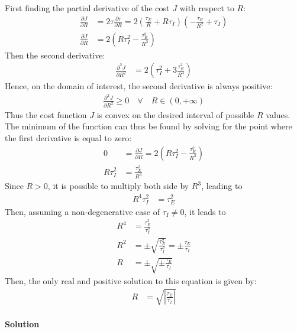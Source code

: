 First finding the partial derivative of the cost $J$ with respect to $R$:
%
\begin{align}
\frac{ \partial J }{ \partial R  } &=  2 \tau \frac{ \partial \tau }{ \partial R } = 2 \left( \frac{\tau_E}{R} + R \tau_I \right) \left( -\frac{\tau_E}{R^2} + \tau_I \right) \\
\frac{ \partial J }{ \partial R  } &= 2 \left( R \tau_I^2 - \frac{\tau_E^2}{R^3} \right)
\end{align}
%
Then the second derivative:
%
\begin{align}
\frac{ \partial^2 J }{ \partial R^2  } &= 2 \left( \tau_I^2 + 3 \frac{\tau_E^2}{R^4} \right)
\end{align}
%
Hence, on the domain of interest, the second derivative is always positive:
%
\begin{align}
\frac{ \partial^2 J }{ \partial R^2  } \geq 0  \quad \forall \quad R \in (0,+\infty)
\end{align}
%
Thus the cost function $J$ is convex on the desired interval of possible $R$ values. The minimum of the function can thus be found by solving for the point where the first derivative is equal to zero:
%
\begin{align}
0 &= \frac{ \partial J }{ \partial R  } = 2 \left( R \tau_I^2 - \frac{\tau_E^2}{R^3} \right) \\
R \tau_I^2 &= \frac{\tau_E^2}{R^3} 
\end{align}
%
Since $R>0$, it is possible to multiply both side by $R^3$, leading to
%
\begin{align}
R^4 \tau_I^2 &= \tau_E^2
\end{align}
%
Then, assuming a non-degenerative case of $\tau_I \neq 0$, it leads to
%
\begin{align}
R^4  &= \frac{\tau_E^2}{\tau_I^2} \\
R^2  &= \pm \sqrt{ \frac{\tau_E^2}{\tau_I^2} } = \pm \frac{\tau_E}{\tau_I} \\
R    &= \pm \sqrt{ \pm \frac{\tau_E}{\tau_I} } 
\end{align}
%
Then, the only real and positive solution to this equation is given by:
%
\begin{align}
R    &= \sqrt{ \left| \frac{\tau_E}{\tau_I} \right|} 
\end{align}
%

\paragraph{Solution}

